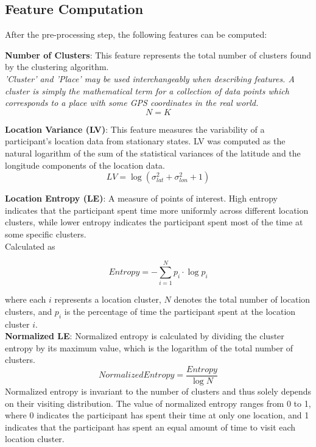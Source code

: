 \subsection{Feature Computation}
After the pre-processing step, the following features can be computed:

\textbf{Number of Clusters}: This feature represents the total number of clusters found by the clustering algorithm.\\
\textit{'Cluster' and 'Place' may be used interchangeably when describing features. A cluster is simply the mathematical term for a collection of data points which corresponds to a place with some GPS coordinates in the real world.}\\

$$N = K$$

\textbf{Location Variance (LV)}: This feature measures the variability of a participant’s location data from stationary states. LV was computed as the natural logarithm of the sum of the statistical variances of the latitude and the longitude components of the location data.\\

$$LV = \log (\sigma^2_{lat} + \sigma^2_{lon} + 1) $$

\textbf{Location Entropy (LE)}: A measure of points of interest. High
entropy indicates that the participant spent time more uniformly across different location
clusters, while lower entropy indicates the participant spent most of the time at some
specific clusters.\\
Calculated as 

$$Entropy = - \sum_{i=1}^N p_i \cdot \log p_i$$

where each $i$ represents a location cluster, $N$ denotes the total number of location clusters, and $p_i$ is the percentage of time the participant spent at the location cluster $i$. \\

\textbf{Normalized LE}: Normalized entropy is calculated by dividing the cluster entropy by its maximum value, which is the logarithm of the total number of clusters. 
$$Normalized Entropy = \frac{Entropy}{\log N}$$
Normalized entropy is invariant to the number of clusters and thus solely depends on their visiting distribution. The value of normalized entropy ranges from 0 to 1, where 0 indicates the participant has spent their time at only one location, and 1 indicates that the participant has spent an equal amount of time to visit each location cluster.\\

